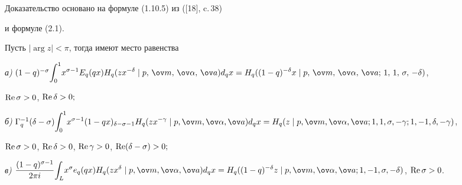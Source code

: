  


Доказательство основано на формуле (1.10.5) из ([18], c.\,38) 


и формуле (2.1). 


 


\begin{thms} Пусть $|\arg 


z|<\pi$, тогда имеют место равенства 


 


{\em а)} $(1-q)^{-\sigma}\displaystyle{\int^1_0} x^{\sigma-1}E_q(q 


x)H_q(z x^{-\delta}\mid p,\,\ov m,\,\ov\alpha,\,\ov a)d_q 


x=H_q((1-q)^{-\delta}x\mid p,\,\ov m,\,\ov\alpha,\,\ov 


a;\,1,\,1,\,\sigma,\,-\delta)$, \linebreak


$\operatorname{Re}\sigma>0$, $\operatorname{Re}\delta>0;$ 


 


{\em б)} $\Gamma^{-1}_q(\delta-\sigma) 


\displaystyle{\int^1_0}x^{\sigma-1}(1-q x)_{\delta-\sigma-1}H_q 


(z x^{-\gamma}\mid p,\ov m,\ov\alpha,\ov a)d_q x= 


H_q(z\mid p,\ov m,\ov\alpha,\ov a;1,1,\sigma,-\gamma; 


1,-1,\linebreak \delta,-\gamma)$, 


$\operatorname{Re}\sigma>0$, $\operatorname{Re}\delta>0$, $\operatorname{Re}\gamma>0$, $\operatorname{Re}(\delta-\sigma)>0;$ 


 


{\em в)} $\dfrac{(1-q)^{\sigma-1}}{2\pi i} 


\displaystyle{\int_L}x^\sigma e_q(q x)H_q(z x^\delta\mid 


p,\ov m,\ov\alpha,\ov a)d_q x=H_q((1-q)^{-\delta}z\mid 


p,\ov m,\ov\alpha,\ov a;1,-1,\sigma,-\delta)$, $\re\sigma>0$. 


\end{thms} 


 


